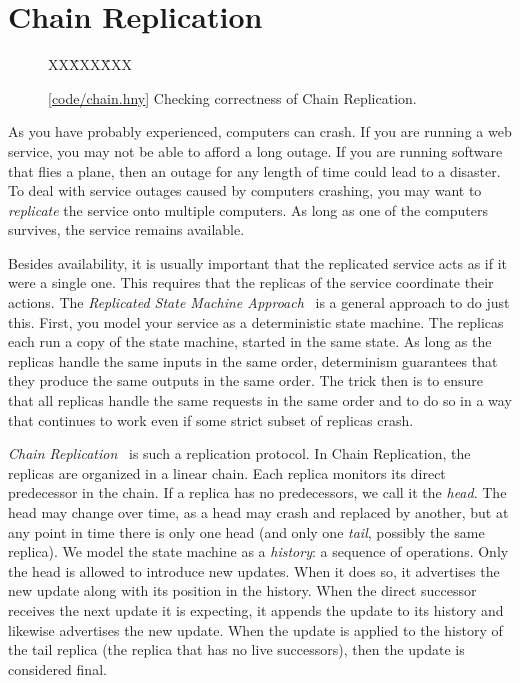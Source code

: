 \documentclass{report}
\newcommand{\harmonysource}[1]{
\begin{tabbing}
XX\=XXX\=XXX\kill
    
\end{tabbing}
}
\newcommand{\harmonylink}[1]{%
[\href{https://harmony.cs.cornell.edu/#1}{\underline{#1}}]%
}
\newenvironment{code}{
\tcolorbox
}{
\endtcolorbox
}
\begin{document}
\chapter{Chain Replication}
\label{ch:chain}

\begin{figure}
\begin{code}
\harmonysource{chain}
\end{code}
\caption{\harmonylink{code/chain.hny} Checking correctness of Chain Replication.}
\label{fig:chain}
\end{figure}

%
%
As you have probably experienced, computers can crash.
If you are running a web service, you may not be able to afford
a long outage.  If you are running software that flies a plane,
then an outage for any length of time could lead to a disaster.
To deal with service outages caused by computers crashing, you may want
to \emph{replicate} the service onto multiple computers.  As long as
one of the computers survives, the service remains available.

%
%
%
Besides availability, it is usually important that the replicated
service acts as if it were a single one.  This requires that the
replicas of the service coordinate their actions.
The \emph{Replicated State Machine Approach}~\cite{Lam78,S90} is a
general approach to do just this.
First, you model your service as a deterministic state
machine.  The replicas each run a copy of the state machine, started
in the same state.  As long as the replicas handle the same inputs
in the same order, determinism guarantees that they produce the same
outputs in the same order.
The trick then is to ensure that all replicas handle the
same requests in the same order and to do so in a way that continues
to work even if some strict subset of replicas crash.

\emph{Chain Replication}~\cite{vRS04} is such a replication protocol.
In Chain Replication, the replicas are organized in a linear chain.
Each replica monitors its direct predecessor in the chain.  If a replica has
no predecessors, we call it the \emph{head}.  The head may change over
time, as a head may crash and replaced by another, but at any point in
time there is only one head
(and only one \emph{tail}, possibly the same replica).
We model the state machine as a \emph{history}: a sequence of operations.
Only the head is allowed to introduce new updates.
When it does so, it advertises the new update along with its position
in the history.  When the direct successor receives the next update
it is expecting, it appends the update to its history and likewise
advertises the new update.  When the update is applied to the history
of the tail replica (the replica that has no live successors),
then the update is considered final.
\end{document}

